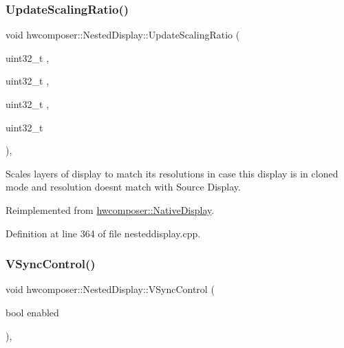 \subsubsection{\texorpdfstring{Update\+Scaling\+Ratio()}{UpdateScalingRatio()}}
{\footnotesize\ttfamily void hwcomposer\+::\+Nested\+Display\+::\+Update\+Scaling\+Ratio (\begin{DoxyParamCaption}\item[{uint32\+\_\+t}]{,  }\item[{uint32\+\_\+t}]{,  }\item[{uint32\+\_\+t}]{,  }\item[{uint32\+\_\+t}]{ }\end{DoxyParamCaption})\hspace{0.3cm}{\ttfamily [override]}, {\ttfamily [virtual]}}

Scales layers of display to match it\textquotesingle{}s resolutions in case this display is in cloned mode and resolution doesn\textquotesingle{}t match with Source Display. 

Reimplemented from \mbox{\hyperlink{classhwcomposer_1_1NativeDisplay_abfad592c2a5e956760c194fa7831171c}{hwcomposer\+::\+Native\+Display}}.



Definition at line 364 of file nesteddisplay.\+cpp.


\begin{DoxyCode}{0}
\end{DoxyCode}
\mbox{\label{classhwcomposer_1_1NestedDisplay_ab6b0f8f36573b7c347805131734f0b47}} 
\subsubsection{\texorpdfstring{V\+Sync\+Control()}{VSyncControl()}}
{\footnotesize\ttfamily void hwcomposer\+::\+Nested\+Display\+::\+V\+Sync\+Control (\begin{DoxyParamCaption}\item[{bool}]{enabled }\end{DoxyParamCaption})\hspace{0.3cm}{\ttfamily [override]}, {\ttfamily [virtual]}}



